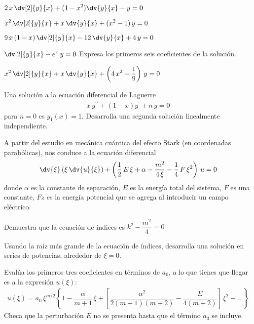 \begin{milista}
\begin{milista}
\begin{fleqn}
\setlength\itemsep{1em}
\item  $ \displaystyle 2 \, x \, \dv[2]{y}{x} + (1 - x^{2}) \dv{y}{x} - y = 0 $
\item $ \displaystyle x^{2} \, \dv[2]{y}{x} + x \, \dv{y}{x} + (x^{2} - 1) \, y = 0 $
\item $9 \, x \, (1 - x) \, \displaystyle \dv[2]{y}{x} - 12 \, \dv{y}{x} + 4 \, y = 0$
\item $\displaystyle \dv[2]{y}{x} - e^{x} \, y = 0$ \quad Expresa los primeros seis coeficientes de la solución.
\item $\displaystyle x^{2} \, \dv[2]{y}{x} + x \, \dv{y}{x} + \left( 4 \, x^{2} - \dfrac{1}{9} \right) \, y = 0$
\end{fleqn}
\end{milista}
\item Una solución a la ecuación diferencial de Laguerre
\begin{align*}
x \, y^{\prime \prime} + (1-x) y^\prime + n \, y = 0
\end{align*}
para $n=0$ es $y_{1}(x)=1$. Desarrolla una segunda solución linealmente independiente.
\item A partir del estudio en mecánica cuántica del efecto Stark (en coordenadas parabólicas), nos conduce a la ecuación diferencial
\begin{align*}
\dv{\xi} \left( \xi\, \dv{u}{\xi} \right) + \left( \dfrac{1}{2} \, E \, \xi + \alpha - \dfrac{m^{2}}{4 \, \xi} - \dfrac{1}{4} \, F \, \xi^{2} \right) \, u = 0
\end{align*}
donde $\alpha$ es la constante de separación, $E$ es la energía total del sistema, $F$ es una constante, $Fz$ es la energía potencial que se agrega al introducir un campo eléctrico.
\begin{milista}
\item Demuestra que la ecuación de índices es $k^{2} - \dfrac{m^{2}}{4} = 0$
\item Usando la raíz más grande de la ecuación de índices, desarrolla una solución en series de potencias, alrededor de $\xi=0$.
\item Evalúa los primeros tres coeficientes en términos de $a_{0}$, a lo que tienes que llegar es a la expresión $u (\xi)$:
\begin{align*}
u(\xi) =  a_{0} \, \xi^{m/2} \left\lbrace 1 - \dfrac{\alpha}{m+1} \, \xi + \left[ \dfrac{\alpha^{2}}{2(m+1)(m+2)} - \dfrac{E}{4(m+2)} \right] \, \xi^{2} + \ldots \right\rbrace
\end{align*}
Checa que la perturbación $E$ no se presenta hasta que el término $a_{3}$ se incluye.

\end{milista}
\end{milista}
